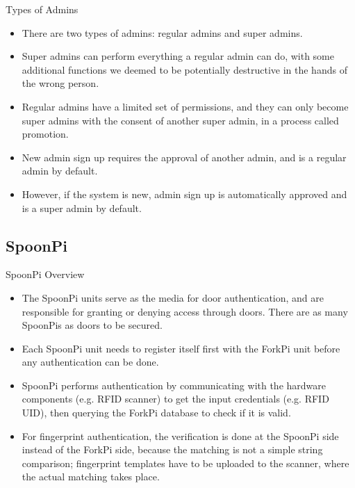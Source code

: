 \begin{frame}{Types of Admins}
\begin{itemize}
    \item<1-> There are two types of admins: regular admins and super admins.
    \item<2-> Super admins can perform everything a regular admin can do, with some additional functions we deemed to be potentially destructive in the hands of the wrong person. %
    \item<3-> Regular admins have a limited set of permissions, and they can only become super admins with the consent of another super admin, in a process called promotion.
    \item<4-> New admin sign up requires the approval of another admin, and is a regular admin by default.
    \item<5-> However, if the system is new, admin sign up is automatically approved and is a super admin by default.
\end{itemize}
\end{frame}

\subsection{SpoonPi}
\begin{frame}{SpoonPi Overview}
\begin{itemize}
    \item<1-> The SpoonPi units serve as the media for door authentication, and are responsible for granting or denying access through doors. There are as many SpoonPis as doors to be secured.
    \item<2-> Each SpoonPi unit needs to register itself first with the ForkPi unit before any authentication can be done.
    \item<3-> SpoonPi performs authentication by communicating with the hardware components (e.g. RFID scanner) to get the input credentials (e.g. RFID UID), then querying the ForkPi database to check if it is valid.
    \item<4-> For fingerprint authentication, the verification is done at the SpoonPi side instead of the ForkPi side, because the matching is not a simple string comparison; fingerprint templates have to be uploaded to the scanner, where the actual matching takes place.
\end{itemize}
\end{frame}

